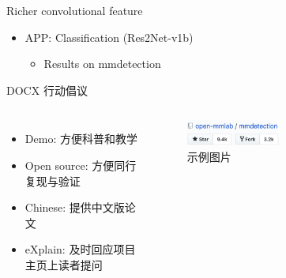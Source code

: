 \begin{frame}{Richer convolutional feature}
  \begin{itemize}
    \item APP: Classification (Res2Net-v1b)
      \begin{itemize}
        \item Results on mmdetection
      \end{itemize}
  \end{itemize}
  \vspace{0.5em}
  \centering
\end{frame}

\begin{frame}{\textcolor{midblue}{D}\textcolor{myred}{O}\textcolor{mygreen}{C}\textcolor{mypurple}{X} 行动倡议}
  \begin{columns}
    \begin{itemize}
      \item \textcolor{midblue}{D}emo: 方便科普和教学
      \item \textcolor{myred}{O}pen source: 方便同行复现与验证
      \item \textcolor{mygreen}{C}hinese: 提供中文版论文
      \item e\textcolor{mypurple}{X}plain: 及时回应项目主页上读者提问
    \end{itemize}
    \begin{figure}
      \centering
      \includegraphics[width=0.5\textwidth]{image/image1.png}
      \caption{示例图片}
    \end{figure}
  \end{columns}
\end{frame}

